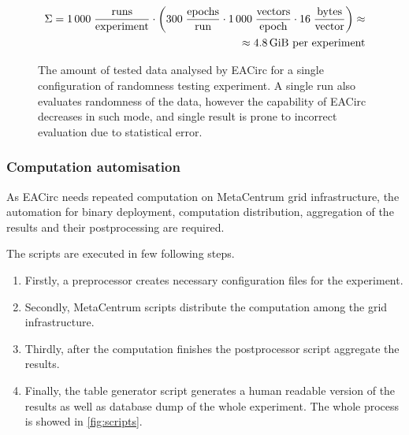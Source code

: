 \documentclass[
  print, %
  Table,   %
  nolof,     %
  nolot,     %
  11pt, %
  oneside  %
]{fithesis3}
\begin{document}
\begin{figure}[t]
    \begin{equation*}
        \begin{aligned}
    \Sigma = 1\,000 \;
             \frac{\textnormal{runs}}
                  {\textnormal{experiment}}
             \cdot
             \left(
             300 \;
             \frac{\textnormal{epochs}}
                  {\textnormal{run}}
             \cdot
             1\,000 \;
             \frac{\textnormal{vectors}}
                  {\textnormal{epoch}}
             \cdot
             16 \;
             \frac{\textnormal{bytes}}
                  {\textnormal{vector}}
             \right) \approx\\
             \approx 4.8 \textnormal{\,GiB per experiment}
        \end{aligned}
    \end{equation*}
    \caption{The amount of tested data analysed by EACirc for a single configuration of randomness testing experiment. A single run also evaluates randomness of the data, however the capability of EACirc decreases in such mode, and single result is prone to incorrect evaluation due to statistical error.}
    \label{fig:dataUsage}
\end{figure}


\subsubsection{Computation automisation}
\label{subsubsec:method-spec-ss-auto}

As EACirc needs repeated computation on MetaCentrum grid infrastructure, the automation for binary deployment, computation distribution, aggregation of the results and their postprocessing are required.

The scripts are executed in few following steps.

\begin{enumerate}[noitemsep,topsep=3pt,parsep=3pt,partopsep=3pt]
 \item Firstly, a preprocessor creates necessary configuration files for the experiment.
 \item Secondly, MetaCentrum scripts distribute the computation among the grid infrastructure.
 \item Thirdly, after the computation finishes the postprocessor script aggregate the results. 
 \item Finally, the table generator script generates a human readable version of the results as well as database dump of the whole experiment. The whole process is showed in \cref{fig:scripts}.
\end{enumerate}
\end{document}
